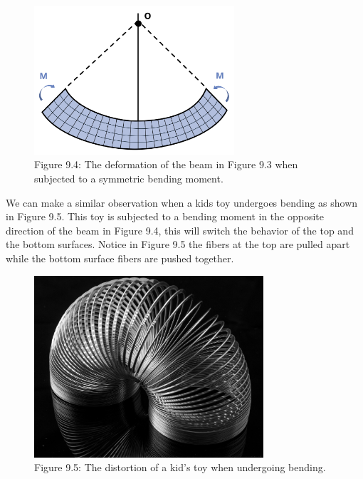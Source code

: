 \documentclass[
  letterpaper,
  DIV=11,
  numbers=noendperiod]{scrreprt}
\begin{document}
\begin{figure}[H]

{\centering \includegraphics[width=2.92708in,height=\textheight]{images/CH9 PNGs/Figure 9.4.png}

}

\caption{Figure 9.4: The deformation of the beam in Figure 9.3 when
subjected to a symmetric bending moment.}

\end{figure}%

We can make a similar observation when a kids toy undergoes bending as
shown in Figure 9.5. This toy is subjected to a bending moment in the
opposite direction of the beam in Figure 9.4, this will switch the
behavior of the top and the bottom surfaces. Notice in Figure 9.5 the
fibers at the top are pulled apart while the bottom surface fibers are
pushed together.

\begin{figure}[H]

{\centering \includegraphics[width=3.35417in,height=\textheight]{images/CH9 PNGs/Figure 9.5.jpg}

}

\caption{Figure 9.5: The distortion of a kid's toy when undergoing
bending.}

\end{figure}%
\end{document}
